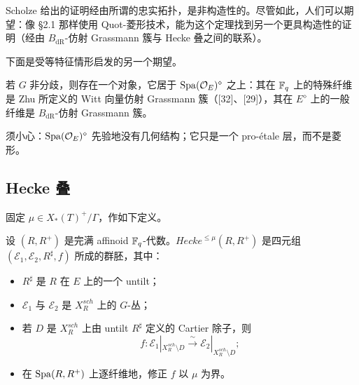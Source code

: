 Scholze 给出的证明经由所谓的忠实拓扑，是非构造性的。尽管如此，人们可以期望：像 §2.1 那样使用 Quot-菱形技术，能为这个定理找到另一个更具构造性的证明（经由 $B_{\mathrm{dR}}$-仿射 Grassmann 簇与 Hecke 叠之间的联系）。

下面是受等特征情形启发的另一个期望。

\begin{hope}\label{hope:3.15}
若 $G$ 非分歧，则存在一个对象，它居于 $\mathrm{Spa}(\mathcal{O}_E)^{\diamond}$ 之上：其在 $\mathbb{F}_q$ 上的特殊纤维是 Zhu 所定义的 Witt 向量仿射 Grassmann 簇（[32]、[29]），其在 $E^{\diamond}$ 上的一般纤维是 $B_{\mathrm{dR}}$-仿射 Grassmann 簇。
\end{hope}

\begin{remark}\label{rem:3.16}
须小心：$\mathrm{Spa}(\mathcal{O}_E)^{\diamond}$ 先验地没有几何结构；它只是一个 pro-étale 层，而不是菱形。
\end{remark}

\subsection{Hecke 叠}%

固定 $\mu\in X_*(T)^+/\Gamma$，作如下定义。

\begin{definition}\label{def:3.17}
设 $(R,R^+)$ 是完满 affinoid $\mathbb{F}_q$-代数。$\mathit{Hecke}^{\le\mu}(R,R^+)$ 是四元组 $(\mathcal{E}_1,\mathcal{E}_2,R^\sharp,f)$ 所成的群胚，其中：
\begin{itemize}
  \item $R^\sharp$ 是 $R$ 在 $E$ 上的一个 untilt；
  \item $\mathcal{E}_1$ 与 $\mathcal{E}_2$ 是 $X_R^{sch}$ 上的 $G$-丛；
  \item 若 $D$ 是 $X_R^{sch}$ 上由 untilt $R^\sharp$ 定义的 Cartier 除子，则
  \[
    f:\mathcal{E}_1|_{X_R^{sch}\setminus D}\xrightarrow{\ \sim\ }\mathcal{E}_2|_{X_R^{sch}\setminus D};
  \]
  \item 在 $\mathrm{Spa}(R,R^+)$ 上逐纤维地，修正 $f$ 以 $\mu$ 为界。
\end{itemize}
\end{definition}

